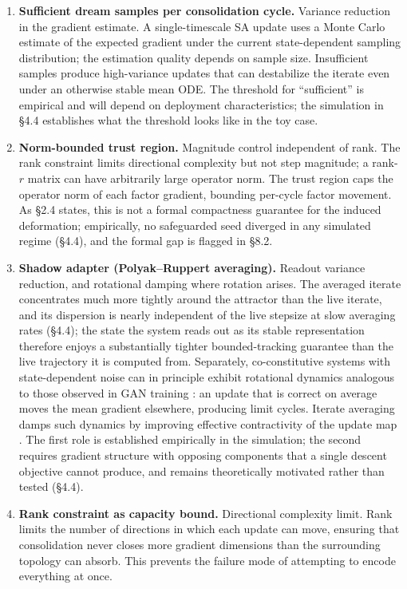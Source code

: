 \documentclass[11pt]{article}
\begin{document}
\begin{enumerate}[nosep]
    \item \textbf{Sufficient dream samples per consolidation cycle.} Variance reduction in the gradient estimate. A single-timescale SA update uses a Monte Carlo estimate of the expected gradient under the current state-dependent sampling distribution; the estimation quality depends on sample size. Insufficient samples produce high-variance updates that can destabilize the iterate even under an otherwise stable mean ODE. The threshold for ``sufficient'' is empirical and will depend on deployment characteristics; the simulation in \S 4.4 establishes what the threshold looks like in the toy case.
    \item \textbf{Norm-bounded trust region.} Magnitude control independent of rank. The rank constraint limits directional complexity but not step magnitude; a rank-$r$ matrix can have arbitrarily large operator norm. The trust region caps the operator norm of each factor gradient, bounding per-cycle factor movement. As \S 2.4 states, this is not a formal compactness guarantee for the induced deformation; empirically, no safeguarded seed diverged in any simulated regime (\S 4.4), and the formal gap is flagged in \S 8.2.
    \item \textbf{Shadow adapter (Polyak--Ruppert averaging).} Readout variance reduction, and rotational damping where rotation arises. The averaged iterate concentrates much more tightly around the attractor than the live iterate, and its dispersion is nearly independent of the live stepsize at slow averaging rates (\S 4.4); the state the system reads out as its stable representation therefore enjoys a substantially tighter bounded-tracking guarantee than the live trajectory it is computed from. Separately, co-constitutive systems with state-dependent noise can in principle exhibit rotational dynamics analogous to those observed in GAN training \cite{mescheder2018}: an update that is correct on average moves the mean gradient elsewhere, producing limit cycles. Iterate averaging damps such dynamics by improving effective contractivity of the update map \cite{mou2020}. The first role is established empirically in the simulation; the second requires gradient structure with opposing components that a single descent objective cannot produce, and remains theoretically motivated rather than tested (\S 4.4).
    \item \textbf{Rank constraint as capacity bound.} Directional complexity limit. Rank limits the number of directions in which each update can move, ensuring that consolidation never closes more gradient dimensions than the surrounding topology can absorb. This prevents the failure mode of attempting to encode everything at once.
\end{enumerate}
\end{document}
